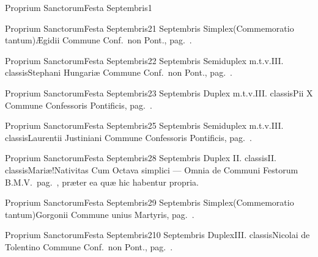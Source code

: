\documentclass[nocturnale-romanum.tex]{subfiles}
\begin{document}
	{Proprium Sanctorum}{Festa Septembris}{1}{}
	{}{}{}{}{}

	{Proprium Sanctorum}{Festa Septembris}{2}{1 Septembris}
	{Simplex}{(Commemoratio tantum)}{Ægidii}
	{Commune Conf.\ non Pont., pag.\ \pageref{M-CONP}.}
	{}

	{Proprium Sanctorum}{Festa Septembris}{2}{2 Septembris}
	{Semiduplex m.t.v.}{III. classis}{Stephani Hungariæ}
	{Commune Conf.\ non Pont., pag.\ \pageref{M-CONP}.}
	{}

	{Proprium Sanctorum}{Festa Septembris}{2}{3 Septembris}
	{Duplex m.t.v.}{III. classis}{Pii X}
	{Commune Confessoris Pontificis, pag.\ \pageref{M-COPO}.}
	{}

	{Proprium Sanctorum}{Festa Septembris}{2}{5 Septembris}
	{Semiduplex m.t.v.}{III. classis}{Laurentii Justiniani}
	{Commune Confessoris Pontificis, pag.\ \pageref{M-COPO}.}
	{}

	{Proprium Sanctorum}{Festa Septembris}{2}{8 Septembris}
	{Duplex II. classis}{II. classis}{Mariæ!Nativitas}
	{Cum Octava simplici --- Omnia de Communi Festorum B.M.V.\ pag.\ \pageref{M-CBMV}, præter ea quæ hic habentur propria.}
	{}
\tedeumrubric

	{Proprium Sanctorum}{Festa Septembris}{2}{9 Septembris}
	{Simplex}{(Commemoratio tantum)}{Gorgonii}
	{Commune unius Martyris, pag.\ \pageref{M-UMEX}.}
	{}

	{Proprium Sanctorum}{Festa Septembris}{2}{10 Septembris}
	{Duplex}{III. classis}{Nicolai de Tolentino}
	{Commune Conf.\ non Pont., pag.\ \pageref{M-CONP}.}
	{}
\end{document}
